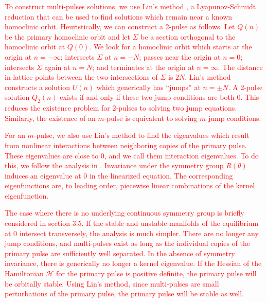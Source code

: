\documentclass[12pt]{elsarticle}
\newcommand{\revised}[1]{ \textcolor{red}{#1} }
\begin{document}
\revised{To construct multi-pulses solutions, we use Lin's method \cite{Lin1990, Lin2008,Knobloch2000}, a Lyapunov-Schmidt reduction that can be used to find solutions which remain near a known homoclinic orbit. Heuristically, we can construct a 2-pulse as follows. Let $Q(n)$ be the primary homoclinic orbit and let $\Sigma$ be a section orthogonal to the homoclinic orbit at $Q(0)$. We look for a homoclinic orbit which starts at the origin at $n = -\infty$; intersects $\Sigma$ at $n = -N$; passes near the origin at $n = 0$; intersects $\Sigma$ again at $n = N$; and terminates at the origin at $n = \infty$. The distance in lattice points between the two intersections of $\Sigma$ is $2N$. Lin's method constructs a solution $U(n)$ which generically has ``jumps'' at $n = \pm N$. A 2-pulse solution $Q_2(n)$ exists if and only if these two jump conditions are both 0. This reduces the existence problem for 2-pulses to solving two jump equations. Similarly, the existence of an $m$-pulse is equivalent to solving $m$ jump conditions.}

\revised{For an $m$-pulse, we also use Lin's method to find the eigenvalues which result from nonlinear interactions between neighboring copies of the primary pulse. These eigenvalues are close to 0, and we call them interaction eigenvalues. To do this, we follow the analysis in \cite{Sandstede1998}. Invariance under the symmetry group $R(\theta)$ induces an eigenvalue at 0 in the linearized equation. The corresponding eigenfunctions are, to leading order, piecewise linear combinations of the kernel eigenfunction.}

\revised{The case where there is no underlying continuous symmetry group is briefly considered in section 3.5. If the stable and unstable manifolds of the equilibrium at 0 intersect transversely, the analysis is much simpler. There are no longer any jump conditions, and multi-pulses exist as long as the individual copies of the primary pulse are sufficiently well separated. In the absence of symmetry invariance, there is generically no longer a kernel eigenvalue. If the Hessian of the Hamiltonian $\mathcal{H}$ for the primary pulse is positive definite, the primary pulse will be orbitally stable. Using Lin's method, since multi-pulses are small perturbations of the primary pulse, the primary pulse will be stable as well.}
\end{document}
